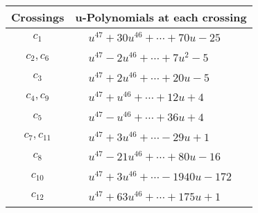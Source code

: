 \documentclass[1p]{elsarticle_modified}
\theoremstyle{definition}
\begin{document}
\begin{tabular}{m{50pt}|m{274pt}}
Crossings & \hspace{64pt}u-Polynomials at each crossing \\
\hline $$\begin{aligned}c_{1}\end{aligned}$$&$\begin{aligned}
&u^{47}+30 u^{46}+\cdots+70 u-25
\end{aligned}$\\
\hline $$\begin{aligned}c_{2},c_{6}\end{aligned}$$&$\begin{aligned}
&u^{47}-2 u^{46}+\cdots+7 u^2-5
\end{aligned}$\\
\hline $$\begin{aligned}c_{3}\end{aligned}$$&$\begin{aligned}
&u^{47}+2 u^{46}+\cdots+20 u-5
\end{aligned}$\\
\hline $$\begin{aligned}c_{4},c_{9}\end{aligned}$$&$\begin{aligned}
&u^{47}+u^{46}+\cdots+12 u+4
\end{aligned}$\\
\hline $$\begin{aligned}c_{5}\end{aligned}$$&$\begin{aligned}
&u^{47}- u^{46}+\cdots+36 u+4
\end{aligned}$\\
\hline $$\begin{aligned}c_{7},c_{11}\end{aligned}$$&$\begin{aligned}
&u^{47}+3 u^{46}+\cdots-29 u+1
\end{aligned}$\\
\hline $$\begin{aligned}c_{8}\end{aligned}$$&$\begin{aligned}
&u^{47}-21 u^{46}+\cdots+80 u-16
\end{aligned}$\\
\hline $$\begin{aligned}c_{10}\end{aligned}$$&$\begin{aligned}
&u^{47}+3 u^{46}+\cdots-1940 u-172
\end{aligned}$\\
\hline $$\begin{aligned}c_{12}\end{aligned}$$&$\begin{aligned}
&u^{47}+63 u^{46}+\cdots+175 u+1
\end{aligned}$\\
\hline
\end{tabular}\\~\\
\end{document}
